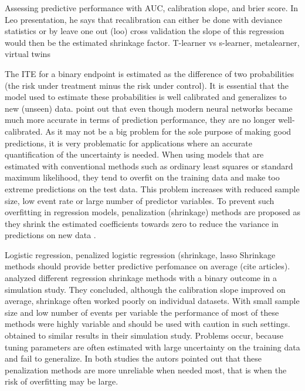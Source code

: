Assessing predictive performance with AUC, calibration slope, and brier score. In Leo presentation, he says that recalibration can either be done with deviance statistics or by leave one out (loo) cross validation the slope of this regression would then be the estimated shrinkage factor.
T-learner vs s-learner, metalearner, virtual twins

The ITE for a binary endpoint is estimated as the difference of two probabilities (the risk under treatment minus the risk under control). It is essential that the model used to estimate these probabilities is well calibrated and generalizes to new (unseen) data. \citep{guo2017} point out that even though modern neural networks became much more accurate in terms of prediction performance, they are no longer well-calibrated. As it may not be a big problem for the sole purpose of making good predictions, it is very problematic for applications where an accurate quantification of the uncertainty is needed. When using models that are estimated with conventional methods such as ordinary least squares or standard maximum likelihood, they tend to overfit on the training data and make too extreme predictions on the test data. This problem increases with reduced sample size, low event rate or large number of predictor variables. To prevent such overfitting in regression models, penalization (shrinkage) methods are proposed as they shrink the estimated coefficients towards zero to reduce the variance in predictions on new data \citep{riley2021}. 




Logistic regression, penalized logistic regression (shrinkage, lasso
Shrinkage methods should provide better predictive perfomance on average (cite articles). \citet{calster2020} analyzed different regression shrinkage methods with a binary outcome in a simulation study. They concluded, although the calibration slope improved on average, shrinkage often worked poorly on individual datasets. With small sample size and low number of events per variable the performance of most of these methods were highly variable and should be used with caution in such settings. \citet{riley2021} obtained to similar results in their simulation study. Problems occur, because tuning parameters are often estimated with large uncertainty on the training data and fail to generalize. In both studies the autors pointed out that these penalization methods are more unreliable when needed most, that is when the risk of overfitting may be large.


